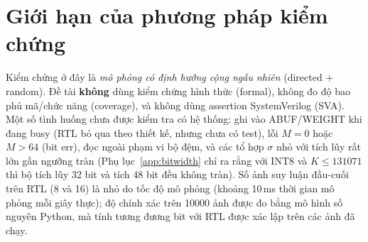 \section{Giới hạn của phương pháp kiểm chứng}
Kiểm chứng ở đây là \emph{mô phỏng có định hướng cộng ngẫu nhiên} (directed + random). Đề tài \textbf{không} dùng kiểm chứng hình thức (formal), không đo độ bao phủ mã/chức năng (coverage), và không dùng assertion SystemVerilog (SVA). Một số tình huống chưa được kiểm tra có hệ thống: ghi vào ABUF/WEIGHT khi đang busy (RTL bỏ qua theo thiết kế, nhưng chưa có test), lỗi $M=0$ hoặc $M>64$ (bit err), đọc ngoài phạm vi bộ đệm, và các tổ hợp $\sigma$ nhỏ với tích lũy rất lớn gần ngưỡng tràn (Phụ lục~\ref{app:bitwidth} chỉ ra rằng với INT8 và $K\le\num{131071}$ thì bộ tích lũy 32 bit và tích 48 bit đều không tràn). Số ảnh suy luận đầu-cuối trên RTL (8 và 16) là nhỏ do tốc độ mô phỏng (khoảng 10\,ms thời gian mô phỏng mỗi giây thực); độ chính xác trên \num{10000} ảnh được đo bằng mô hình số nguyên Python, mà tính tương đương bit với RTL được xác lập trên các ảnh đã chạy.
